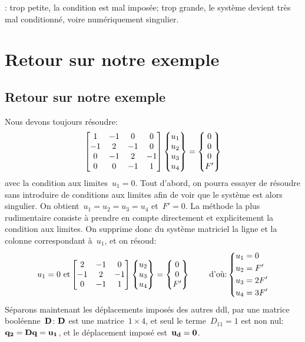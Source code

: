 \medskip
{}: trop petite, la condition est mal imposée; 
trop grande, le système devient très mal conditionné, voire numériquement singulier.

\medskip
\ifVersionAvecExemplesSepares
  \section{Retour sur notre exemple}
\else
  \subsection{Retour sur notre exemple}
\fi
Nous devons toujours résoudre:
\begin{equation}
\MM*{1 & -1 & 0 & 0 \\ -1 & 2 & -1 & 0 \\ 0 & -1 & 2 & -1\\ 0&0&-1&1}
\VV*{u_1\\u_2\\u_3\\u_4}
=
\VV*{0\\0\\0\\F'}
\end{equation}
avec la condition aux limites~$u_1=0$.
\medskipvm
Tout d'abord, on pourra essayer de résoudre sans introduire de conditions aux limites afin de voir que le système est alors singulier. On obtient~$u_1=u_2=u_3=u_4$ et~$F'=0$.
\medskipvm
La méthode la plus rudimentaire consiste à prendre en compte directement et explicitement la condition aux limites.
On supprime donc du système matriciel la ligne et la colonne correspondant à~$u_1$, et on résoud:
\begin{equation}\label{Eq-Base}
u_1=0 \text{ et}
\MM*{2 & -1 & 0 \\ -1 & 2 & -1\\ 0&-1&1}
\VV*{u_2\\u_3\\u_4}
=
\VV*{0\\0\\F'}
\qquad \text{ d'où:} 
\left\{\begin{aligned} &u_1=0 \\ &u_2=F' \\ &u_3=2F' \\ &u_4=3F' \end{aligned}\right.
\end{equation}
\medskipvm
Séparons maintenant les déplacements imposés des autres ddl, par une matrice booléenne~$\MM{D}$:
$\MM{D}$ est une matrice~$1\times 4$, et seul le terme~$D_{11}=1$ est non nul:~$\VV{q_2}=\MM{D}\VV{q}=\VV{u_1}$,
et le déplacement imposé est~$\VV{u_d}=\VV{0}$.

